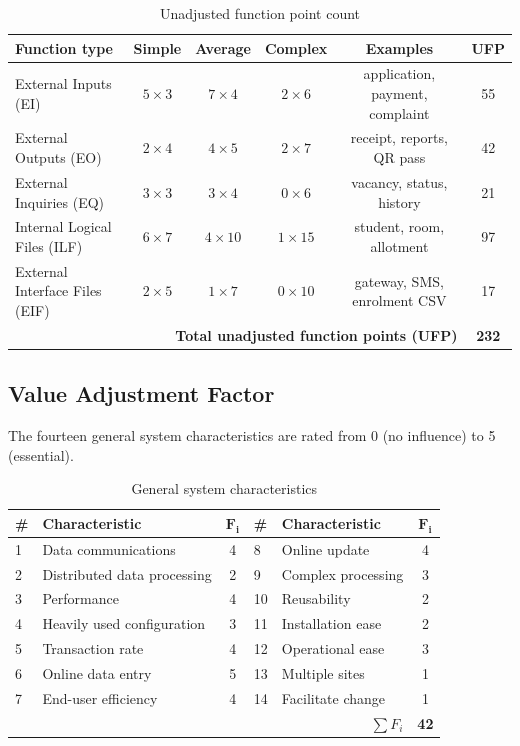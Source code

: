 \documentclass[11pt,a4paper]{report}
\begin{document}
\begin{table}[H]
\centering\small
\caption{Unadjusted function point count}\label{tab:fpcount}
\begin{tabular}{lccccc}
\toprule
\textbf{Function type} & \textbf{Simple} & \textbf{Average} & \textbf{Complex} & \textbf{Examples} & \textbf{UFP}\\
\midrule
External Inputs (EI) & $5\times3$ & $7\times4$ & $2\times6$ & application, payment, complaint & 55\\
External Outputs (EO) & $2\times4$ & $4\times5$ & $2\times7$ & receipt, reports, QR pass & 42\\
External Inquiries (EQ) & $3\times3$ & $3\times4$ & $0\times6$ & vacancy, status, history & 21\\
Internal Logical Files (ILF) & $6\times7$ & $4\times10$ & $1\times15$ & student, room, allotment & 97\\
External Interface Files (EIF) & $2\times5$ & $1\times7$ & $0\times10$ & gateway, SMS, enrolment CSV & 17\\
\midrule
\multicolumn{5}{r}{\textbf{Total unadjusted function points (UFP)}} & \textbf{232}\\
\bottomrule
\end{tabular}
\end{table}

\subsection{Value Adjustment Factor}
The fourteen general system characteristics are rated from 0 (no influence) to 5 (essential).

\begin{table}[H]
\centering\small
\caption{General system characteristics}\label{tab:gsc}
\begin{tabular}{llc@{\hspace{1.2cm}}llc}
\toprule
\textbf{\#} & \textbf{Characteristic} & $\mathbf{F_i}$ & \textbf{\#} & \textbf{Characteristic} & $\mathbf{F_i}$\\
\midrule
1 & Data communications & 4 & 8 & Online update & 4\\
2 & Distributed data processing & 2 & 9 & Complex processing & 3\\
3 & Performance & 4 & 10 & Reusability & 2\\
4 & Heavily used configuration & 3 & 11 & Installation ease & 2\\
5 & Transaction rate & 4 & 12 & Operational ease & 3\\
6 & Online data entry & 5 & 13 & Multiple sites & 1\\
7 & End-user efficiency & 4 & 14 & Facilitate change & 1\\
\midrule
\multicolumn{5}{r}{$\sum F_i$} & \textbf{42}\\
\bottomrule
\end{tabular}
\end{table}
\end{document}
